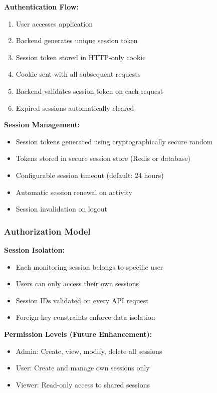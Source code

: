 \textbf{Authentication Flow:}
\begin{enumerate}
    \item User accesses application
    \item Backend generates unique session token
    \item Session token stored in HTTP-only cookie
    \item Cookie sent with all subsequent requests
    \item Backend validates session token on each request
    \item Expired sessions automatically cleared
\end{enumerate}

\textbf{Session Management:}
\begin{itemize}
    \item Session tokens generated using cryptographically secure random
    \item Tokens stored in secure session store (Redis or database)
    \item Configurable session timeout (default: 24 hours)
    \item Automatic session renewal on activity
    \item Session invalidation on logout
\end{itemize}

\subsubsection{Authorization Model}

\textbf{Session Isolation:}
\begin{itemize}
    \item Each monitoring session belongs to specific user
    \item Users can only access their own sessions
    \item Session IDs validated on every API request
    \item Foreign key constraints enforce data isolation
\end{itemize}

\textbf{Permission Levels (Future Enhancement):}
\begin{itemize}
    \item Admin: Create, view, modify, delete all sessions
    \item User: Create and manage own sessions only
    \item Viewer: Read-only access to shared sessions
\end{itemize}

